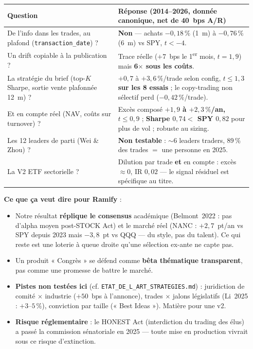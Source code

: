 \documentclass[11pt,a4paper]{article}
\newcommand{\code}[1]{\texttt{\small #1}}
\begin{document}
\begin{center}\small
\begin{tabular}{p{6.1cm}p{9.3cm}}
\toprule
Question & Réponse (2014--2026, donnée canonique, net de 40~bps A/R) \\
\midrule
De l'info dans les trades, au plafond (\code{transaction\_date}) ? & \textbf{Non} --- achats $-0{,}18\,\%$
(1~m) à $-0{,}76\,\%$ (6~m) vs SPY, $t<-4$. \\
Un drift copiable à la publication ? & Trace réelle ($+7$~bps le 1\textsuperscript{er} mois, $t=1{,}9$)
mais \textbf{6$\times$ sous les coûts}. \\
La stratégie du brief (top-$K$ Sharpe, sortie vente plafonnée 12~m) ? & $+0{,}7$ à $+3{,}6\,\%$/trade selon
config, \textbf{$t\leq1{,}3$ sur les 8 essais} ; le copy-trading non sélectif perd ($-0{,}42\,\%$/trade). \\
Et en compte réel (NAV, coûts sur turnover) ? & Excès composé \textbf{$+1{,}9$ à $+2{,}3\,\%$/an,
$t\leq0{,}9$} ; \textbf{Sharpe $0{,}74<$ SPY $0{,}82$} pour plus de vol ; robuste au sizing. \\
Les 12 leaders de parti (Wei \& Zhou) ? & \textbf{Non testable} : $\sim$6 leaders traders, 89\,\% des
trades $=$ une personne en 2025. \\
La V2 ETF sectorielle ? & Dilution par trade \textbf{et} en compte : excès $\approx0$, IR $0{,}02$ --- le
signal résiduel est spécifique au titre. \\
\bottomrule
\end{tabular}
\end{center}

\textbf{Ce que ça veut dire pour Ramify} :
\begin{itemize}[leftmargin=1.4em,itemsep=1pt]
\item Notre résultat \textbf{réplique le consensus} académique (Belmont~2022 : pas d'alpha moyen
      post-STOCK Act) et le marché réel (NANC : $+2{,}7$~pt/an vs SPY depuis 2023 mais $-3{,}8$~pt vs QQQ
      --- du style, pas du talent). Ce qui reste est une loterie à queue droite qu'une sélection ex-ante
      ne capte pas.
\item Un produit « Congrès » se défend comme \textbf{bêta thématique transparent}, pas comme une promesse
      de battre le marché.
\item \textbf{Pistes non testées ici} (cf. \code{ETAT\_DE\_L\_ART\_STRATEGIES.md}) : juridiction de comité
      $\times$ industrie ($+50$~bps à l'annonce), trades $\times$ jalons législatifs (Li~2025 :
      $+3$--$5\,\%$), conviction par taille (« Best Ideas »). Matière pour une v2.
\item \textbf{Risque réglementaire} : le HONEST Act (interdiction du trading des élus) a passé la
      commission sénatoriale en 2025 --- toute mise en production vivrait sous ce risque d'extinction.
\end{itemize}
\end{document}
